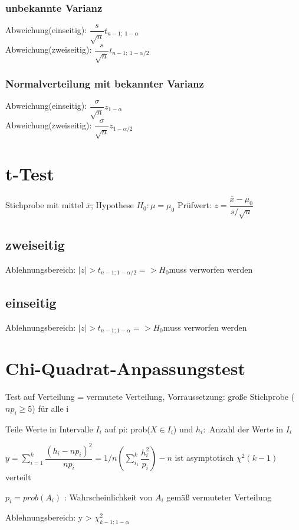 \subsubsection*{unbekannte Varianz}
Abweichung(einseitig): $\dfrac{s}{\sqrt{n}} t_{n-1;~ 1-\alpha}$\\
Abweichung(zweiseitig): $\dfrac{s}{\sqrt{n}} t_{n-1;~ 1-\alpha/2}$

\subsubsection*{Normalverteilung mit bekannter Varianz}
Abweichung(einseitig): $\dfrac{\sigma}{\sqrt{n}} z_{1-\alpha}$\\
Abweichung(zweiseitig): $\dfrac{\sigma}{\sqrt{n}} z_{1-\alpha/2}$


\section*{t-Test}
Stichprobe mit mittel $\overline{x}$; Hypothese $H_0: \mu = \mu_0$
Prüfwert: $z= \dfrac{\overline{x} - \mu_0}{s/\sqrt{n}}$

\subsection*{zweiseitig}
Ablehnungsbereich: $|z| > t_{n-1;1-\alpha/2} => H_0 $muss verworfen werden 
\subsection*{einseitig}
Ablehnungsbereich: $|z| > t_{n-1;1-\alpha} => H_0 $muss verworfen werden 


\section*{Chi-Quadrat-Anpassungstest}
Test auf Verteilung = vermutete Verteilung, Vorraussetzung: große Stichprobe ($np_i \geq 5$) für alle i

Teile Werte in Intervalle $I_i$ auf  pi: prob($X \in I_i$) und $h_i:$ Anzahl der Werte in $I_i$

$y = \sum_{i=1}^k \dfrac{(h_i -np_i)^2}{n p_i} = 1/n \left( \sum_{i_1}^k \dfrac{h_i^2}{p_i} \right) -n $
ist asymptotisch  $\chi^2 (k-1)$ verteilt 

$p_i = prob(A_i)$ : Wahrscheinlichkeit von $A_i$ gemäß vermuteter Verteilung

Ablehnungsbereich: y > $\chi^2_{k-1;1-\alpha}$